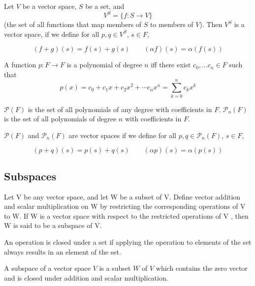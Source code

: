 \begin{definition}
  Let $V$ be a vector space, $S$ be a set, and
  \[
    V^S = \{ f : S \to V \}
  \]
  (the set of all functions that map members of $S$ to members of $V$). Then $V^S$ is a vector space, if we define for all $p, q \in V^S$, $s \in F$,

  \[
    (f + g)(s) = f(s) + g(s) \qquad (\alpha f)(s) = \alpha (f(s))
  \]
\end{definition}

\begin{definition}[Polynomial]
  A function $p : F \to F$ is a polynomial of degree $n$ iff there exist $c_0, \ldots c_n \in F$ such that
  \[
    p(x) = c_0 + c_1 x + c_2 x^2 + \cdots c_n x^n = \sum_{k=0}^n c_k x^k
  \]

  $\mathcal{P}(F)$ is the set of all polynomials of any degree with coefficients in $F$. $\mathcal{P}_n(F)$ is the set of all polynomials of degree $n$ with coefficients in $F$.

  $\mathcal{P}(F)$ and $\mathcal{P}_n(F)$ are vector spaces if we define for all $p, q \in \mathcal{P}_n(F)$, $s \in F$,

  \[
    (p + q)(s) = p(s) + q(s) \qquad (\alpha p)(s) = \alpha (p(s))
  \]
\end{definition}

\subsection{Subspaces}

\begin{definition}[Subspace]
  Let V be any vector space, and let W be a subset of V. Define vector addition and scalar multiplication on W by restricting the corresponding operations of V to W. If W is a vector space with respect to the restricted operations of V , then W is said to be a subspace of V.
\end{definition}

\begin{definition}[Closed]
  An operation is closed under a set if applying the operation to elements of the set always results in an element of the set.
\end{definition}

\begin{definition}[Subspace]
  A subspace of a vector space $V$ is a subset $W$ of $V$ which contains the zero vector and is closed under addition and scalar multiplication.
\end{definition}

